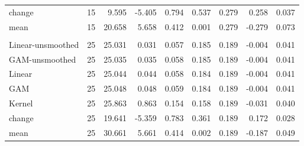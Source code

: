 \documentclass[useAMS,usenatbib,referee]{biom}
\begin{document}
\begin{table}[t]
\begin{tabular}{lrrrrrrrr}
\hspace{1em}change & 15 & 9.595 & -5.405 & 0.794 & 0.537 & 0.279 & 0.258 & 0.037\\
\hspace{1em}mean & 15 & 20.658 & 5.658 & 0.412 & 0.001 & 0.279 & -0.279 & 0.073\\
\addlinespace[0.3em]
\multicolumn{9}{l}{\textbf{Large residual effect}}\\
\hspace{1em}Linear-unsmoothed & 25 & 25.031 & 0.031 & 0.057 & 0.185 & 0.189 & -0.004 & 0.041\\
\hspace{1em}GAM-unsmoothed & 25 & 25.035 & 0.035 & 0.058 & 0.185 & 0.189 & -0.004 & 0.041\\
\hspace{1em}Linear & 25 & 25.044 & 0.044 & 0.058 & 0.184 & 0.189 & -0.004 & 0.041\\
\hspace{1em}GAM & 25 & 25.048 & 0.048 & 0.059 & 0.184 & 0.189 & -0.004 & 0.041\\
\hspace{1em}Kernel & 25 & 25.863 & 0.863 & 0.154 & 0.158 & 0.189 & -0.031 & 0.040\\
\hspace{1em}change & 25 & 19.641 & -5.359 & 0.783 & 0.361 & 0.189 & 0.172 & 0.028\\
\hspace{1em}mean & 25 & 30.661 & 5.661 & 0.414 & 0.002 & 0.189 & -0.187 & 0.049\\
\bottomrule
\end{tabular}
\end{table}
\end{document}
